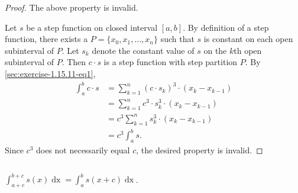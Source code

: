 \documentclass{report}
\begin{document}
\begin{proof}

  The above property is invalid.

  \divider

  Let $s$ be a step function on closed interval $[a, b]$.
  By definition of a step function, there exists a 
    $P = \{x_0, x_1, \ldots, x_n\}$ such that $s$ is constant on each open
    subinterval of $P$.
  Let $s_k$ denote the constant value of $s$ on the $k$th open subinterval of
    $P$.
  Then $c \cdot s$ is a step function with step partition $P$.
  By \eqref{sec:exercise-1.15.11-eq1},
    \begin{align*}
      \int_a^b c \cdot s
        & = \sum_{k=1}^n (c \cdot s_k)^3 \cdot (x_k - x_{k-1}) \\
        & = \sum_{k=1}^n c^3 \cdot s_k^3 \cdot (x_k - x_{k-1}) \\
        & = c^3 \sum_{k=1}^n s_k^3 \cdot (x_k - x_{k-1}) \\
        & = c^3 \int_a^b s.
    \end{align*}
  Since $c^3$ does not necessarily equal $c$, the desired property is invalid.

\end{proof}

\subsection{}%
\label{sub:exercise-1.15.11d}

$\int_{a+c}^{b+c} s(x) \mathop{dx} = \int_a^b s(x + c) \mathop{dx}$.

\end{document}
